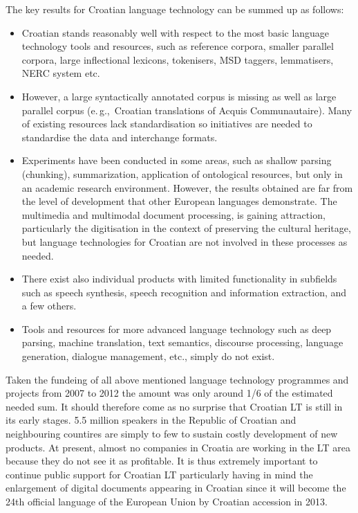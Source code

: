\begin{multicols}{2}
The key results for Croatian language technology can be summed up as follows:

\begin{itemize}
\item Croatian stands reasonably well with respect to the most basic language technology tools and resources, such as reference corpora, smaller parallel corpora, large inflectional lexicons, tokenisers, MSD taggers, lemmatisers, NERC system etc.
\item However, a large syntactically annotated corpus is missing as well as large parallel corpus (e.\,g.,~Croatian translations of Acquis Communautaire). Many of existing resources lack standardisation so initiatives are needed to standardise the data and interchange formats.
\item Experiments have been conducted in some areas, such as shallow parsing (chunking), summarization, application of ontological resources, but only in an academic research environment. However, the results obtained are far from the level of development that other European languages demonstrate. The multimedia and multimodal document processing, is gaining attraction, particularly the digitisation in the context of preserving the cultural heritage, but language technologies for Croatian are not involved in these processes as needed.
\item There exist also individual products with limited functionality in subfields such as speech synthesis, speech recognition and information extraction, and a few others.
\item Tools and resources for more advanced language technology such as deep parsing, machine translation, text semantics, discourse processing, language generation, dialogue management, etc., simply do not exist.
\end{itemize}

Taken the fundeing of all above mentioned language technology programmes and projects from 2007 to 2012 the amount was only around 1/6 of the estimated needed sum. It should therefore come as no surprise that Croatian LT is still in its early stages. 5.5 million speakers in the Republic of Croatian and neighbouring countires are simply to few to sustain costly development of new products. At present, almost no companies in Croatia are working in the LT area because they do not see it as profitable. It is thus extremely important to continue public support for Croatian LT particularly having in mind the enlargement of digital documents appearing in Croatian since it will become the 24th official language of the European Union by Croatian accession in 2013.


\end{multicols}
